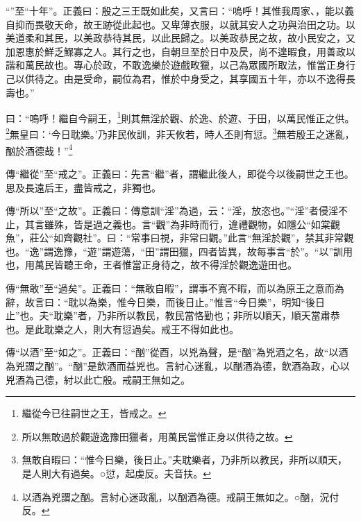 {\noindent\shu{}\fzkt “”至“十年”。正義曰：殷之三王既如此矣，又言曰：“嗚呼！其惟我周家、，能以義自抑而畏敬天命，故王跡從此起也。又卑薄衣服，以就其安人之功與治田之功。以美道柔和其民，以美政恭待其民，以此民歸之。以美政恭民之故，故小民安之，又加恩惠於鮮乏鰥寡之人。其行之也，自朝旦至於日中及昃，尚不遑暇食，用善政以諧和萬民故也。專心於政，不敢逸樂於遊戲畋獵，以己為眾國所取法，惟當正身行己以供待之。由是受命，嗣位為君，惟於中身受之，其享國五十年，亦以不逸得長壽也。” \par}

曰：“嗚呼！繼自今嗣王，\footnote{繼從今已往嗣世之王，皆戒之。}則其無淫於觀、於逸、於遊、于田，以萬民惟正之供。\footnote{所以無敢過於觀遊逸豫田獵者，用萬民當惟正身以供待之故。}無皇曰：‘今日耽樂。’乃非民攸訓，非天攸若，時人丕則有愆。\footnote{無敢自暇曰：“惟今日樂，後日止。”夫耽樂者，乃非所以教民，非所以順天，是人則大有過矣。○愆，起虔反。夫音扶。}無若殷王之迷亂，酗於酒德哉！”\footnote{以酒為兇謂之酗。言紂心迷政亂，以酗酒為德。戒嗣王無如之。○酗，況付反。}


{\noindent\zhuan{}\fzbyks 傳“繼從”至“戒之”。正義曰：先言“繼”者，謂繼此後人，即從今以後嗣世之王也。思及長遠后王，盡皆戒之，非獨也。 \par}

{\noindent\zhuan{}\fzbyks 傳“所以”至“之故”。正義曰：傳意訓“淫”為過，云：“淫，放恣也。”“淫”者侵淫不止，其言雖殊，皆是過之義也。言“觀”為非時而行，違禮觀物，如隱公“如棠觀魚”，莊公“如齊觀社”。曰：“常事曰視，非常曰觀。”此言“無淫於觀”，禁其非常觀也。“逸”謂逸豫，“遊”謂遊蕩，“田”謂田獵，四者皆異，故每事言“於”。“以”訓用也，用萬民皆聽王命，王者惟當正身待之，故不得淫於觀逸遊田也。 \par}

{\noindent\zhuan{}\fzbyks 傳“無敢”至“過矣”。正義曰：“無敢自暇”，謂事不寬不暇，而以為原王之意而為辭，故言曰：“耽以為樂，惟今日樂，而後日止。”惟言“今日樂”，明知“後日止”也。夫“耽樂”者，乃非所以教民，教民當恪勤也；非所以順天，順天當肅恭也。是此耽樂之人，則大有愆過矣。戒王不得如此也。 \par}

{\noindent\zhuan{}\fzbyks 傳“以酒”至“如之”。正義曰：“酗”從酉，以兇為聲，是“酗”為兇酒之名，故“以酒為兇謂之酗”。“酗”是飲酒而益兇也。言紂心迷亂，以酗酒為德，飲酒為政，心以兇酒為己德，紂以此亡殷。戒嗣王無如之。 \par}

